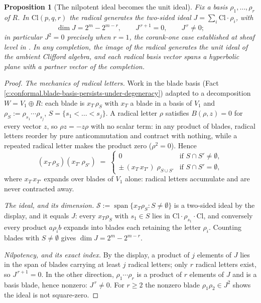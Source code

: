 \documentclass[11pt]{article}
\newtheorem{proposition}[theorem]{Proposition}
\theoremstyle{definition}
\theoremstyle{plain}
\providecommand{\Cl}{}\renewcommand{\Cl}{\mathrm{Cl}}
\begin{document}
\begin{proposition}[The nilpotent ideal becomes the unit ideal]\label{c:conformal.nilpotent-ideal-becomes-unit-ideal}
Fix a basis $\rho_1, \dots, \rho_r$ of $R$. In $\Cl(p,q,r)$ the radical generates the two-sided ideal $J = \sum_i \Cl \cdot \rho_i$, with
\[
\dim J = 2^m - 2^{m-r}, \qquad J^{\,r+1} = 0, \qquad J^{\,r} \neq 0 ;
\]
in particular $J^2 = 0$ precisely when $r = 1$, the corank-one case established at sheaf level in \cite[Thm.~3.1]{ButlerT4}. In any completion, the image of the radical generates the \emph{unit} ideal of the ambient Clifford algebra, and each radical basis vector spans a hyperbolic plane with a partner vector of the completion.
\end{proposition}
\begin{proof}
\emph{The mechanics of radical letters.} Work in the blade basis (Fact \ref{c:conformal.blade-basis-persists-under-degeneracy}) adapted to a decomposition $W = V_1 \oplus R$: each blade is $x_T\, \rho_S$ with $x_T$ a blade in a basis of $V_1$ and $\rho_S := \rho_{s_1} \cdots \rho_{s_j}$, $S = \{s_1 < \dots < s_j\}$. A radical letter $\rho$ satisfies $B(\rho, z) = 0$ for every vector $z$, so $\rho z = -z\rho$ with no scalar term: in any product of blades, radical letters reorder by pure anticommutation and contract with nothing, while a repeated radical letter makes the product zero ($\rho^2 = 0$). Hence
\[
(x_T\, \rho_S)(x_{T'}\, \rho_{S'}) \;=\;
\begin{cases}
0 & \text{if } S \cap S' \neq \emptyset, \\
\pm\, (x_T\, x_{T'})\; \rho_{S \cup S'} & \text{if } S \cap S' = \emptyset ,
\end{cases}
\]
where $x_T\, x_{T'}$ expands over blades of $V_1$ alone: radical letters accumulate and are never contracted away.

\emph{The ideal, and its dimension.} $\mathcal{S} := \operatorname{span}\{x_T \rho_S : S \neq \emptyset\}$ is a two-sided ideal by the display, and it equals $J$: every $x_T \rho_S$ with $s_1 \in S$ lies in $\Cl \cdot \rho_{s_1} \cdot \Cl$, and conversely every product $a \rho_i b$ expands into blades each retaining the letter $\rho_i$. Counting blades with $S \neq \emptyset$ gives $\dim J = 2^m - 2^{m-r}$.

\emph{Nilpotency, and its exact index.} By the display, a product of $j$ elements of $J$ lies in the span of blades carrying at least $j$ radical letters; only $r$ radical letters exist, so $J^{\,r+1} = 0$. In the other direction, $\rho_1 \cdots \rho_r$ is a product of $r$ elements of $J$ and is a basis blade, hence nonzero: $J^{\,r} \neq 0$. For $r \geq 2$ the nonzero blade $\rho_1 \rho_2 \in J^2$ shows the ideal is not square-zero.


\end{proof}
\end{document}
